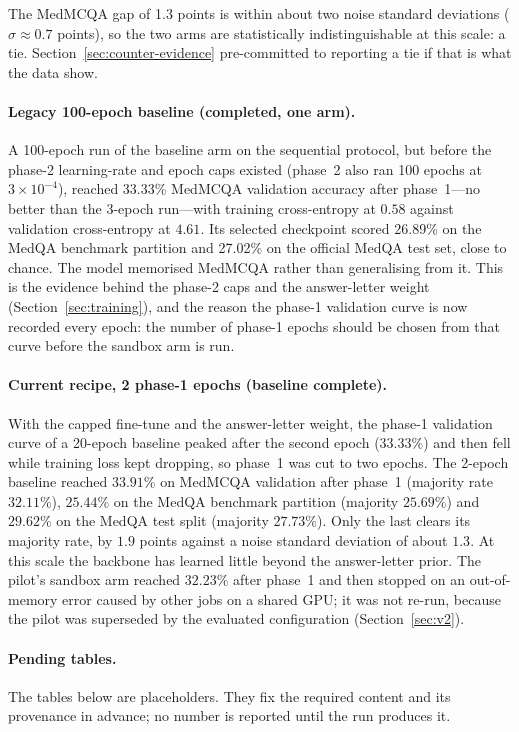 \documentclass[11pt,a4paper]{article}
\theoremstyle{plain}
\theoremstyle{definition}
\theoremstyle{remark}
\begin{document}
\noindent
The MedMCQA gap of 1.3 points is within about two noise standard deviations
($\sigma\approx0.7$ points), so the two arms are statistically
indistinguishable at this scale: a tie. Section~\ref{sec:counter-evidence}
pre-committed to reporting a tie if that is what the data show.

\paragraph{Legacy 100-epoch baseline (completed, one arm).}
A 100-epoch run of the baseline arm on the sequential protocol, but before the
phase-2 learning-rate and epoch caps existed (phase~2 also ran 100 epochs at
$3\times10^{-4}$), reached 33.33\% MedMCQA validation accuracy after
phase~1---no better than the 3-epoch run---with training cross-entropy at
$0.58$ against validation cross-entropy at $4.61$. Its selected checkpoint
scored 26.89\% on the MedQA benchmark partition and 27.02\% on the official
MedQA test set, close to chance. The model memorised MedMCQA rather than
generalising from it. This is the evidence behind the phase-2 caps and the
answer-letter weight (Section~\ref{sec:training}), and the reason the phase-1
validation curve is now recorded every epoch: the number of phase-1 epochs
should be chosen from that curve before the sandbox arm is run.

\paragraph{Current recipe, 2 phase-1 epochs (baseline complete).}
With the capped fine-tune and the answer-letter weight, the phase-1
validation curve of a 20-epoch baseline peaked after the second epoch
($33.33\%$) and then fell while training loss kept dropping, so phase~1 was
cut to two epochs. The 2-epoch baseline reached $33.91\%$ on MedMCQA
validation after phase~1 (majority rate $32.11\%$), $25.44\%$ on the MedQA
benchmark partition (majority $25.69\%$) and $29.62\%$ on the MedQA test
split (majority $27.73\%$). Only the last clears its majority rate, by
$1.9$ points against a noise standard deviation of about $1.3$. At this
scale the backbone has learned little beyond the answer-letter prior. The
pilot's sandbox arm reached $32.23\%$ after phase~1 and then stopped on an
out-of-memory error caused by other jobs on a shared GPU; it was not re-run,
because the pilot was superseded by the evaluated configuration
(Section~\ref{sec:v2}).

\paragraph{Pending tables.}
The tables below are placeholders. They fix the required content and its
provenance in advance; no number is reported until the run produces it.
\end{document}
